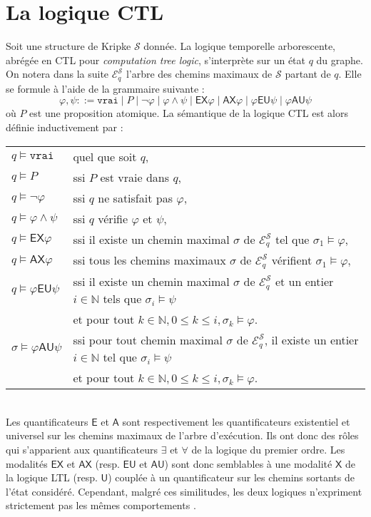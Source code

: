 \section{La logique CTL}
Soit une structure de Kripke $\mathcal{S}$ donnée. La logique temporelle arborescente, abrégée en CTL pour \textit{computation tree logic}, s'interprète sur un état $q$ du graphe. On notera dans la suite $\mathcal{E}^\mathcal{S}_q$ l'arbre des chemins maximaux de $\mathcal{S}$ partant de $q$. Elle se formule à l'aide de la grammaire suivante :
  $$\varphi, \psi ::= \texttt{vrai} \mid P \mid \neg \varphi \mid \varphi \wedge \psi \mid \textsf{EX} \varphi \mid \textsf{AX} \varphi \mid \varphi \textsf{EU} \psi \mid \varphi \textsf{AU} \psi$$
où $P$ est une proposition atomique. La sémantique de la logique CTL est alors définie inductivement par :\\
\begin{tabular}{ll}%
  $q \models \texttt{vrai}$ & quel que soit $q$,\\
  $q \models P$ & ssi $P$ est vraie dans $q$,\\
  $q \models \neg \varphi$ & ssi $q$ ne satisfait pas $\varphi$,\\
  $q \models \varphi \wedge \psi$ & ssi $q$ vérifie $\varphi$ et $\psi$,\\
  $q \models \mathsf{EX} \varphi$ & ssi il existe un chemin maximal $\sigma$ de $\mathcal{E}^\mathcal{S}_q$ tel que $\sigma_1 \models \varphi$,\\
  $q \models \mathsf{AX} \varphi$ & ssi tous les chemins maximaux $\sigma$ de $\mathcal{E}^\mathcal{S}_q$ vérifient $\sigma_1 \models \varphi$,\\
  $q \models \varphi \mathsf{EU} \psi$ & ssi il existe un chemin maximal $\sigma$ de $\mathcal{E}^\mathcal{S}_q$ et un entier $i \in \mathbb{N}$ tels que $\sigma_i \models \psi$\\&\quad et pour tout $k \in \mathbb{N}, 0 \leq k \leq i, \sigma_k \models \varphi$.\\
  $\sigma \models \varphi \mathsf{AU} \psi$ & ssi pour tout chemin maximal $\sigma$ de $\mathcal{E}^\mathcal{S}_q$, il existe un entier $i \in \mathbb{N}$ tel que $\sigma_i \models \psi$\\&\quad et pour tout $k \in \mathbb{N}, 0 \leq k \leq i, \sigma_k \models \varphi$.
\end{tabular}\\

Les quantificateurs $\mathsf{E}$ et $\mathsf{A}$ sont respectivement les quantificateurs existentiel et universel sur les chemins maximaux de l'arbre d'exécution. Ils ont donc des rôles qui s'apparient aux quantificateurs $\exists$ et $\forall$ de la logique du premier ordre. Les modalités $\mathsf{EX}$ et $\mathsf{AX}$ (resp. $\mathsf{EU}$ et $\mathsf{AU}$) sont donc semblables à une modalité $\mathsf{X}$ de la logique LTL (resp. $\mathsf{U}$) couplée à un quantificateur sur les chemins sortants de l'état considéré. Cependant, malgré ces similitudes, les deux logiques n'expriment strictement pas les mêmes comportements \cite{berard-08}.

